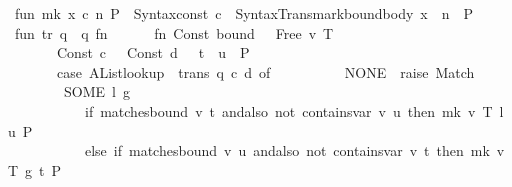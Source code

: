 \begin{isabellebody}
\ \ fun\ mk\ x\ c\ n\ P\ {\isacharequal}{\kern0pt}\ Syntax{\isachardot}{\kern0pt}const\ c\ {\isachardollar}{\kern0pt}\ Syntax{\isacharunderscore}{\kern0pt}Trans{\isachardot}{\kern0pt}mark{\isacharunderscore}{\kern0pt}bound{\isacharunderscore}{\kern0pt}body\ x\ {\isachardollar}{\kern0pt}\ n\ {\isachardollar}{\kern0pt}\ P{\isacharsemicolon}{\kern0pt}\isanewline
\isanewline
\ \ fun\ tr{\isacharprime}{\kern0pt}\ q\ {\isacharequal}{\kern0pt}\ {\isacharparenleft}{\kern0pt}q{\isacharcomma}{\kern0pt}\ fn\ {\isacharunderscore}{\kern0pt}\ {\isacharequal}{\kern0pt}{\isachargreater}{\kern0pt}\isanewline
\ \ \ \ {\isacharparenleft}{\kern0pt}fn\ {\isacharbrackleft}{\kern0pt}Const\ {\isacharparenleft}{\kern0pt}\isactrlsyntaxUNDERSCOREconst {\isasymopen}{\isacharunderscore}{\kern0pt}bound{\isasymclose}{\isacharcomma}{\kern0pt}\ {\isacharunderscore}{\kern0pt}{\isacharparenright}{\kern0pt}\ {\isachardollar}{\kern0pt}\ Free\ {\isacharparenleft}{\kern0pt}v{\isacharcomma}{\kern0pt}\ T{\isacharparenright}{\kern0pt}{\isacharcomma}{\kern0pt}\isanewline
\ \ \ \ \ \ \ \ Const\ {\isacharparenleft}{\kern0pt}c{\isacharcomma}{\kern0pt}\ {\isacharunderscore}{\kern0pt}{\isacharparenright}{\kern0pt}\ {\isachardollar}{\kern0pt}\ {\isacharparenleft}{\kern0pt}Const\ {\isacharparenleft}{\kern0pt}d{\isacharcomma}{\kern0pt}\ {\isacharunderscore}{\kern0pt}{\isacharparenright}{\kern0pt}\ {\isachardollar}{\kern0pt}\ t\ {\isachardollar}{\kern0pt}\ u{\isacharparenright}{\kern0pt}\ {\isachardollar}{\kern0pt}\ P{\isacharbrackright}{\kern0pt}\ {\isacharequal}{\kern0pt}{\isachargreater}{\kern0pt}\isanewline
\ \ \ \ \ \ \ \ {\isacharparenleft}{\kern0pt}case\ AList{\isachardot}{\kern0pt}lookup\ {\isacharparenleft}{\kern0pt}{\isacharequal}{\kern0pt}{\isacharparenright}{\kern0pt}\ trans\ {\isacharparenleft}{\kern0pt}q{\isacharcomma}{\kern0pt}\ c{\isacharcomma}{\kern0pt}\ d{\isacharparenright}{\kern0pt}\ of\isanewline
\ \ \ \ \ \ \ \ \ \ NONE\ {\isacharequal}{\kern0pt}{\isachargreater}{\kern0pt}\ raise\ Match\isanewline
\ \ \ \ \ \ \ \ {\isacharbar}{\kern0pt}\ SOME\ {\isacharparenleft}{\kern0pt}l{\isacharcomma}{\kern0pt}\ g{\isacharparenright}{\kern0pt}\ {\isacharequal}{\kern0pt}{\isachargreater}{\kern0pt}\isanewline
\ \ \ \ \ \ \ \ \ \ \ \ if\ matches{\isacharunderscore}{\kern0pt}bound\ v\ t\ andalso\ not\ {\isacharparenleft}{\kern0pt}contains{\isacharunderscore}{\kern0pt}var\ v\ u{\isacharparenright}{\kern0pt}\ then\ mk\ {\isacharparenleft}{\kern0pt}v{\isacharcomma}{\kern0pt}\ T{\isacharparenright}{\kern0pt}\ l\ u\ P\isanewline
\ \ \ \ \ \ \ \ \ \ \ \ else\ if\ matches{\isacharunderscore}{\kern0pt}bound\ v\ u\ andalso\ not\ {\isacharparenleft}{\kern0pt}contains{\isacharunderscore}{\kern0pt}var\ v\ t{\isacharparenright}{\kern0pt}\ then\ mk\ {\isacharparenleft}{\kern0pt}v{\isacharcomma}{\kern0pt}\ T{\isacharparenright}{\kern0pt}\ g\ t\ P\isanewline

\end{isabellebody}
